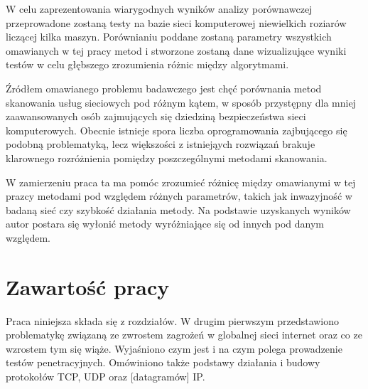 W celu zaprezentowania wiarygodnych wyników analizy porównawczej przeprowadone zostaną testy na bazie sieci komputerowej niewielkich roziarów liczącej kilka maszyn. Porównianiu poddane zostaną parametry wszystkich omawianych w tej pracy metod i stworzone zostaną dane wizualizujące wyniki testów w celu głębszego zrozumienia różnic między algorytmami.


Źródłem omawianego problemu badawczego jest chęć porównania metod skanowania usług sieciowych pod różnym kątem, w sposób przystępny dla mniej zaawansowanych osób zajmujących się dziedziną bezpieczeństwa sieci komputerowych. Obecnie istnieje spora liczba oprogramowania zajbującego się podobną problematyką, lecz większości z istniejąych rozwiązań brakuje klarownego rozróżnienia pomiędzy poszczególnymi metodami skanowania. 


W zamierzeniu praca ta ma pomóc zrozumieć różnicę między omawianymi w tej prazcy metodami pod względem różnych parametrów, takich jak inwazyjność w badaną sieć czy szybkość działania metody. Na podstawie uzyskanych wyników autor postara się wyłonić metody wyróżniające się od innych pod danym względem.



\section{Zawartość pracy}
\label{sec:zawartoscPracy}


Praca niniejsza składa się z  rozdziałów. W drugim pierwszym przedstawiono problematykę związaną ze zwrostem zagrożeń w globalnej sieci internet oraz co ze wzrostem tym się wiąże. Wyjaśniono czym jest i na czym polega prowadzenie testów penetracyjnych. Omówiniono także podstawy działania i budowy protokołów TCP, UDP oraz [datagramów] IP. 


